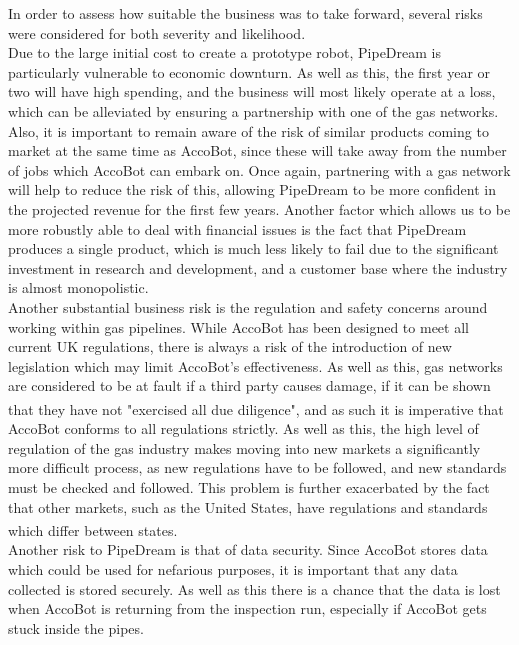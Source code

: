 \documentclass[11pt]{article}		%
\newcommand{\supercite}[1]{\textsuperscript{\cite{#1}}}		%
\begin{document}
     	In order to assess how suitable the business was to take forward, several risks were considered for both severity and likelihood.
     	\\
     	Due to the large initial cost to create a prototype robot, PipeDream is particularly vulnerable to economic downturn.
     	As well as this, the first year or two will have high spending, and the business will most likely operate at a loss, which can be alleviated by ensuring a partnership with one of the gas networks.
     	Also, it is important to remain aware of the risk of similar products coming to market at the same time as AccoBot, since these will take away from the number of jobs which AccoBot can embark on.
     	Once again, partnering with a gas network will help to reduce the risk of this, allowing PipeDream to be more confident in the projected revenue for the first few years.
     	Another factor which allows us to be more robustly able to deal with financial issues is the fact that PipeDream produces a single product, which is much less likely to fail due to the significant investment in research and development, and a customer base where the industry is almost monopolistic.
     	\\
     	Another substantial business risk is the regulation and safety concerns around working within gas pipelines.
     	While AccoBot has been designed to meet all current UK regulations, there  is always a risk of the introduction of new legislation which may limit AccoBot's effectiveness.
     	As well as this, gas networks are considered to be at fault if a third party causes damage, if it can be shown that they have not "exercised all due diligence"\supercite{hse1996guide}, and as such it is imperative that AccoBot conforms to all regulations strictly.
     	As well as this, the high level of regulation of the gas industry makes moving into new markets a significantly more difficult process, as new regulations have to be followed, and new standards must be checked and followed.
     	This problem is further exacerbated by the fact that other markets, such as the United States, have regulations and standards which differ between states\supercite{pless2011making}.
     	\\
     	Another risk to PipeDream is that of data security.
     	Since AccoBot stores data which could be used for nefarious purposes, it is important that any data collected is stored securely.
     	As well as this there is a chance that the data is lost when AccoBot is returning from the inspection run, especially if AccoBot gets stuck inside the pipes.
\end{document}
